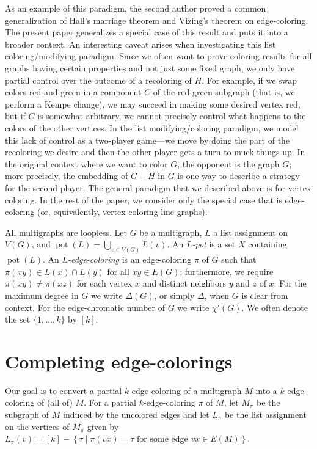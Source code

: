 \documentclass[12pt]{article}
\theoremstyle{plain}
\theoremstyle{definition}
\theoremstyle{remark}
\newcommand{\setbs}[2]{\left\{ #1 \mid #2 \right\}}
\newcommand{\irange}[1]{\left[#1\right]}
\newcommand{\pot}{\operatorname{pot}}
\begin{document}
As an example of this paradigm, the second author proved \cite{HallGame} 
a common generalization of Hall's marriage theorem and Vizing's theorem on
edge-coloring.  The present paper generalizes a special case of this result and
puts it into a broader context.  An interesting
caveat arises when investigating this list coloring/modifying paradigm. 
Since we often want to prove coloring results for all graphs having
certain properties and not just some fixed graph, we only have partial control
over the outcome of a recoloring of $H$. For example, if we swap colors red and
green in a component $C$ of the red-green subgraph (that is, we perform a Kempe
change), we may succeed in making some desired vertex red,
but if $C$ is somewhat arbitrary, we cannot precisely control what happens
to the colors of the other vertices.  In the list modifying/coloring paradigm,
we model this lack of control as a two-player game---we move by doing the part
of the recoloring we desire and then the other player gets a turn to muck things up. 
In the original context where we want to color $G$, the opponent is the graph
$G$; more precisely, the embedding of $G-H$ in $G$ is one way to describe a
strategy for the second player. The general paradigm that we described above is for vertex coloring.  In the
rest of the paper, we consider only the special case that is edge-coloring (or,
equivalently, vertex coloring line graphs).  

All multigraphs are loopless.  Let $G$ be a multigraph, $L$ a list
assignment on $V(G)$, and $\pot(L) = \bigcup_{v\in V(G)} L(v)$. An
\emph{$L$-pot} is a set $X$ containing $\pot(L)$.  An \emph{$L$-edge-coloring}
is an edge-coloring $\pi$ of $G$ such that $\pi(xy) \in L(x) \cap L(y)$ for all
$xy \in E(G)$;  %
furthermore, we require $\pi(xy)\ne \pi(xz)$ for each vertex $x$ and distinct
neighbors $y$ and $z$ of $x$.
For the maximum degree in $G$ we write $\Delta(G)$, or simply
$\Delta$, when $G$ is clear from context.
For the edge-chromatic number of $G$ we write $\chi'(G)$.
We often denote the set $\{1,\ldots,k\}$ by $[k]$.

\section{Completing edge-colorings}
Our goal is to convert a partial $k$-edge-coloring of a multigraph $M$ into a
$k$-edge-coloring of (all of) $M$.  For a partial $k$-edge-coloring $\pi$ of
$M$, let $M_\pi$ be the subgraph of $M$ induced by the uncolored edges and let
$L_\pi$ be the list assignment on the vertices of $M_\pi$ given by 
$L_\pi(v) = \irange{k} - \setbs{\tau}{\pi(vx) = \tau \text{ for some edge  } vx \in E(M)}$. 
\end{document}
